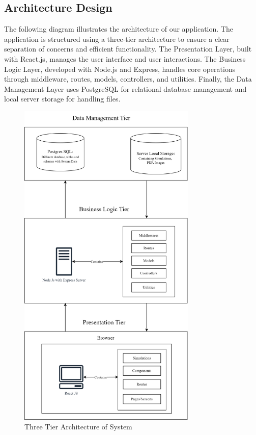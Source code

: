 \subsection{Architecture Design}
The following diagram illustrates the architecture of our application. The application is structured using a three-tier architecture to ensure a clear separation of concerns and efficient functionality. The Presentation Layer, built with React.js, manages the user interface and user interactions. The Business Logic Layer, developed with Node.js and Express, handles core operations through middleware, routes, models, controllers, and utilities. Finally, the Data Management Layer uses PostgreSQL for relational database management and local server storage for handling files.
\begin{figure}[H]
    \centering
    \includegraphics[height=16cm]{Diagrams/Main_Block.png}
    \caption{Three Tier Architecture of System}
\end{figure}
\newpage
